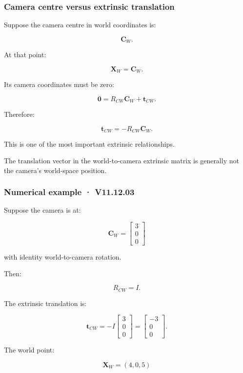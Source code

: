 \subsubsection{Camera centre versus extrinsic translation}\label{camera-centre-versus-extrinsic-translation}

Suppose the camera centre in world coordinates is:

\[
 \mathbf C_W.
\]

At that point:

\[
 \mathbf X_W=\mathbf C_W.
\]

Its camera coordinates must be zero:

\[
 \mathbf0=R_{CW}\mathbf C_W+\mathbf t_{CW}.
\]

Therefore:

\[
 \boxed{ \mathbf t_{CW}=-R_{CW}\mathbf C_W }.
\]

This is one of the most important extrinsic relationships.

The translation vector in the world-to-camera extrinsic matrix is generally not the camera's world-space position.

\subsubsection{Numerical example · V11.12.03}\label{numerical-example-v11.12.03}

Suppose the camera is at:

\[
 \mathbf C_W= \begin{bmatrix}3\\0\\0\end{bmatrix}
\]

with identity world-to-camera rotation.

Then:

\[
 R_{CW}=I.
\]

The extrinsic translation is:

\[
 \mathbf t_{CW}= -I \begin{bmatrix}3\\0\\0\end{bmatrix} = \begin{bmatrix}-3\\0\\0\end{bmatrix}.
\]

The world point:

\[
 \mathbf X_W=(4,0,5)
\]

